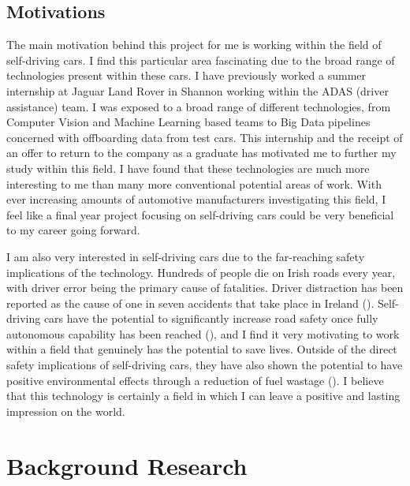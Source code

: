 \documentclass[12pt]{report}
\begin{document}
\section{Motivations}
\begin{flushleft}
The main motivation behind this project for me is working within the field of self-driving cars. I find this particular area fascinating due to the broad range of technologies present within these cars. I have previously worked a summer internship at Jaguar Land Rover in Shannon working within the ADAS (driver assistance) team. I was exposed to a broad range of different technologies, from Computer Vision and Machine Learning based teams to Big Data pipelines concerned with offboarding data from test cars. This internship and the receipt of an offer to return to the company as a graduate has motivated me to further my study within this field. I have found that these technologies are much more interesting to me than many more conventional potential areas of work. With ever increasing amounts of automotive manufacturers investigating this field, I feel like a final year project focusing on self-driving cars could be very beneficial to my career going forward.

I am also very interested in self-driving cars due to the far-reaching safety implications of the technology. Hundreds of people die on Irish roads every year, with driver error being the primary cause of fatalities. Driver distraction has been reported as the cause of one in seven accidents that take place in Ireland (\cite{rsadistraction}). Self-driving cars have the potential to significantly increase road safety once fully autonomous capability has been reached (\cite{milakis2017policy}), and I find it very motivating to work within a field that genuinely has the potential to save lives. Outside of the direct safety implications of self-driving cars, they have also shown the potential to have positive environmental effects through a reduction of fuel wastage (\cite{greenblatt2015autonomous}). I believe that this technology is certainly a field in which I can leave a positive and lasting impression on the world.
\end{flushleft}

\newpage
\chapter{Background Research}
\end{document}
